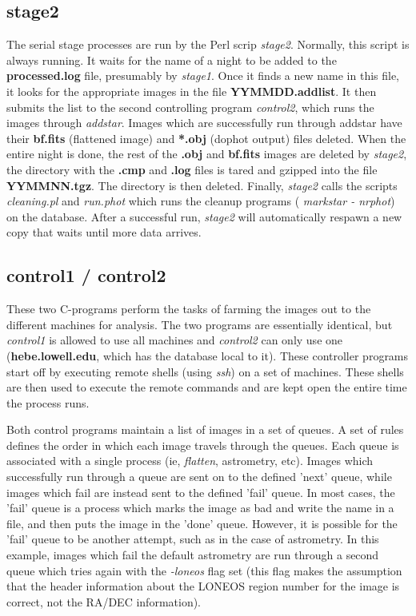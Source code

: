 \documentclass{article}
\newcommand\pr{\em}                   %
\newcommand\ff{\bf}                   %
\begin{document}
{\subsection{stage2}
The serial stage processes are run by the Perl scrip {\pr stage2}.
Normally, this script is always running.  It waits for the name of a
night to be added to the {\ff processed.log} file, presumably by {\pr
stage1}.  Once it finds a new name in this file, it looks for the
appropriate images in the file {\ff YYMMDD.addlist}.  It then submits
the list to the second controlling program {\pr control2}, which runs
the images through {\pr addstar}.  Images which are successfully run
through addstar have their {\ff *bf.fits} (flattened image) and {\ff
*.obj} (dophot output) files deleted.  When the entire night is done,
the rest of the {\ff *.obj} and {\ff *bf.fits} images are deleted by
{\pr stage2}, the directory with the {\ff *.cmp} and {\ff *.log} files
is tared and gzipped into the file {\ff YYMMNN.tgz}.  The directory is
then deleted.  Finally, {\pr stage2} calls the scripts {\pr
cleaning.pl} and {\pr run.phot} which runs the cleanup programs ({\pr
markstar - nrphot}) on the database.  After a successful run, {\pr
stage2} will automatically respawn a new copy that waits until more
data arrives.

\subsection{control1 / control2}
These two C-programs perform the tasks of farming the images out to
the different machines for analysis.  The two programs are essentially
identical, but {\pr control1} is allowed to use all machines and {\pr
control2} can only use one ({\ff hebe.lowell.edu}, which has the database
local to it).  These controller programs start off by executing remote
shells (using {\pr ssh}) on a set of machines.  These shells are then used
to execute the remote commands and are kept open the entire time the
process runs.  

Both control programs maintain a list of images in a set of queues.  A
set of rules defines the order in which each image travels through the
queues.  Each queue is associated with a single process (ie, {\pr
flatten}, astrometry, etc).  Images which successfully run through a
queue are sent on to the defined 'next' queue, while images which fail
are instead sent to the defined 'fail' queue.  In most cases, the
'fail' queue is a process which marks the image as bad and write the
name in a file, and then puts the image in the 'done' queue.  However,
it is possible for the 'fail' queue to be another attempt, such as in
the case of astrometry.  In this example, images which fail the
default astrometry are run through a second queue which tries again
with the {\pr -loneos} flag set (this flag makes the assumption that
the header information about the LONEOS region number for the image is
correct, not the RA/DEC information).

}
\end{document}
